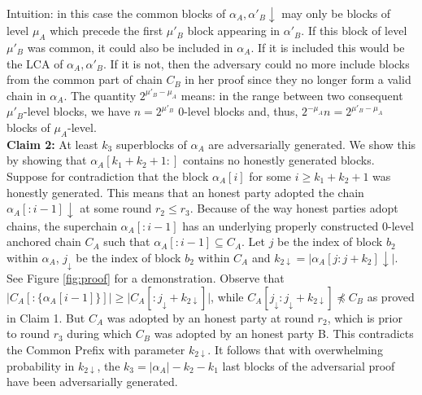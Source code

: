 Intuition: in this case the common blocks of $\alpha_A, \alpha'_B\downarrow$ may only be blocks of level $\mu_A$ which precede the first $\mu'_B$ block appearing in $\alpha'_B$. If this block of level $\mu'_B$ was common, it could also be included in $\alpha_A$. If it is included this would be the LCA of $\alpha_A, \alpha'_B$. If it is not, then the adversary could no more include blocks from the common part of chain $C_B$ in her proof since they no longer form a valid chain in $\alpha_A$. The quantity $2^{\mu'_B - \mu_A}$ means: in the range between two consequent $\mu'_B$-level blocks, we have $n = 2^{\mu'_B}$ 0-level blocks and, thus, $2^{-\mu_A}n = 2^{\mu'_B - \mu_A}$ blocks of $\mu_A$-level. \\

\textbf{Claim 2:} At least $k_3$ superblocks of $\alpha_A$ are adversarially generated. We show this by showing that $\alpha_A[k_1 + k_2 + 1:]$ contains no honestly generated blocks. Suppose for contradiction that the block $\alpha_A[i]$ for some $i \geq k_1 + k_2 + 1$ was honestly generated. This means that an honest party adopted the chain $\alpha_A[:i - 1]\downarrow$ at some round $r_2 \leq r_3$. Because of the way honest parties adopt chains, the superchain $\alpha_A[:i - 1]$ has an underlying properly constructed 0-level anchored chain $C_A$ such that $\alpha_A[:i - 1] \subseteq C_A$. Let $j$ be the index of block $b_2$ within $\alpha_A$, $j_\downarrow$ be the index of block $b_2$ within $C_A$ and $k_{2\downarrow} = \vert \alpha_A[j:j+k_2]\downarrow\vert$. See Figure \ref{fig:proof} for a demonstration. Observe that $\vert C_A[:\{\alpha_A[i-1]\}] \vert \geq \vert C_A[:{j_\downarrow}+k_{2\downarrow}] \vert$, while $C_A[j_\downarrow:j_\downarrow + k_{2\downarrow}] \npreceq C_B$ as proved in Claim 1. But $C_A$ was adopted by an honest party at round $r_2$, which is prior to round $r_3$ during which $C_B$ was adopted by an honest party B. This contradicts the Common Prefix\cite{Backbone} with parameter $k_{2\downarrow}$. It follows that with overwhelming probability in $k_{2\downarrow}$, the $k_3 = \vert \alpha_A \vert - k_2 - k_1$ last blocks of the adversarial proof have been adversarially generated.\\

